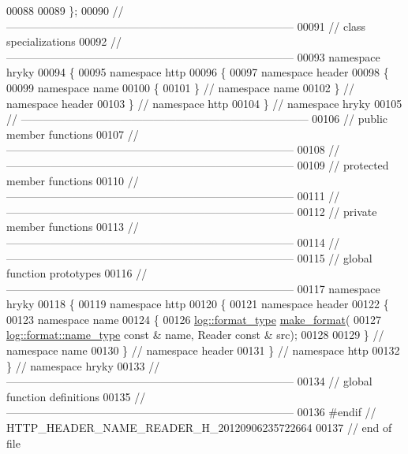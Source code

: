 \begin{DoxyCode}
00088 
00089 \};
00090 \textcolor{comment}{//
      ------------------------------------------------------------------------------}
00091 \textcolor{comment}{// class specializations}
00092 \textcolor{comment}{//
      ------------------------------------------------------------------------------}
00093 \textcolor{keyword}{namespace }hryky
00094 \{
00095 \textcolor{keyword}{namespace }http
00096 \{
00097 \textcolor{keyword}{namespace }header
00098 \{
00099 \textcolor{keyword}{namespace }name
00100 \{
00101 \} \textcolor{comment}{// namespace name}
00102 \} \textcolor{comment}{// namespace header}
00103 \} \textcolor{comment}{// namespace http}
00104 \} \textcolor{comment}{// namespace hryky}
00105 \textcolor{comment}{//
      ------------------------------------------------------------------------------}
00106 \textcolor{comment}{// public member functions}
00107 \textcolor{comment}{//
      ------------------------------------------------------------------------------}
00108 \textcolor{comment}{//
      ------------------------------------------------------------------------------}
00109 \textcolor{comment}{// protected member functions}
00110 \textcolor{comment}{//
      ------------------------------------------------------------------------------}
00111 \textcolor{comment}{//
      ------------------------------------------------------------------------------}
00112 \textcolor{comment}{// private member functions}
00113 \textcolor{comment}{//
      ------------------------------------------------------------------------------}
00114 \textcolor{comment}{//
      ------------------------------------------------------------------------------}
00115 \textcolor{comment}{// global function prototypes}
00116 \textcolor{comment}{//
      ------------------------------------------------------------------------------}
00117 \textcolor{keyword}{namespace }hryky
00118 \{
00119 \textcolor{keyword}{namespace }http
00120 \{
00121 \textcolor{keyword}{namespace }header
00122 \{
00123 \textcolor{keyword}{namespace }name
00124 \{
00126     \hyperlink{namespacehryky_1_1log_ad50448c3f934f1eacd5c1bcffe8111e1}{log::format_type} \hyperlink{namespacehryky_afd615217f648ff164bc40fb82166d959}{make_format}(
00127         \hyperlink{namespacehryky_1_1log_1_1format_ab7408d1e2ed2d648dbf9bba69eb74288}{log::format::name_type} \textcolor{keyword}{const} & name, Reader \textcolor{keyword}{const} & src);
00128 
00129 \} \textcolor{comment}{// namespace name}
00130 \} \textcolor{comment}{// namespace header}
00131 \} \textcolor{comment}{// namespace http}
00132 \} \textcolor{comment}{// namespace hryky}
00133 \textcolor{comment}{//
      ------------------------------------------------------------------------------}
00134 \textcolor{comment}{// global function definitions}
00135 \textcolor{comment}{//
      ------------------------------------------------------------------------------}
00136 \textcolor{preprocessor}{#endif // HTTP\_HEADER\_NAME\_READER\_H\_20120906235722664}
00137 \textcolor{preprocessor}{}\textcolor{comment}{// end of file}
\end{DoxyCode}
